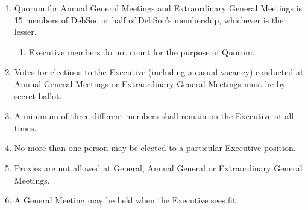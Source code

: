 \begin{enumerate}
\item Quorum for Annual General Meetings and Extraordinary General Meetings is 15 members of DebSoc or half of DebSoc's membership, whichever is the lesser.
  \begin{enumerate}
  \item Executive members do not count for the purpose of Quorum.
  \end{enumerate}

\item Votes for elections to the Executive (including a casual vacancy) conducted at Annual General Meetings or Extraordinary General Meetings must be by secret ballot.

\item A minimum of three different members shall remain on the Executive at all times.

\item No more than one person may be elected to a particular Executive position.

\item Proxies are not allowed at General, Annual General or Extraordinary General Meetings.

\item A General Meeting may be held when the Executive sees fit.
\end{enumerate}

